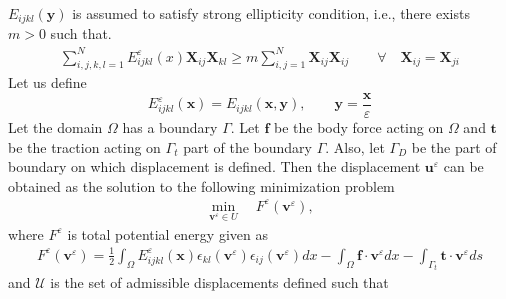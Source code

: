 \documentclass[openright,twoside]{iitkthesis}
\newcommand{\e}[1]{\textbf{#1}}
\newcommand{\fj}[2]{\frac{\partial #1}{\partial #2}}
\begin{document}
$E_{ijkl}(\e y)$ is assumed to satisfy strong ellipticity condition, i.e., there exists $m>0$ such that.
\begin{gather}
\sum_{i,j,k,l=1}^N E_{ijkl}^\varepsilon(x)\textbf{X}_{ij}\textbf{X}_{kl}\geq m\sum_{i,j=1}^N\textbf{X}_{ij}\textbf{X}_{ij} \qquad \forall \quad \textbf{X}_{ij}=\textbf{X}_{ji}
\end{gather}
Let us define
\begin{equation}
E_{ijkl}^\varepsilon (\textbf{x}) = E_{ijkl}(\textbf{x},\textbf{y}), \qquad \textbf{y} = \frac{\textbf{x}}{\varepsilon}
\end{equation}
Let the domain $\Omega$ has a boundary $\Gamma$. Let $\textbf{f}$ be the body force acting on $\Omega$ and $\textbf{t}$ be the traction acting on $\Gamma_t$ part of the boundary $\Gamma$. Also, let $\Gamma_D$ be the part of boundary on which displacement is defined. Then the displacement $\textbf{u}^\varepsilon$ can be obtained as the solution to the following minimization problem
\begin{align}
\label{fem}
\min_{\textbf{v}^\varepsilon\in U} \quad F^\varepsilon(\textbf{v}^\varepsilon),
\end{align} 
where $F^\varepsilon$ is total potential energy given as	
\begin{eqnarray} \label{tpe}
F^\varepsilon(\textbf{v}^\varepsilon) = \frac{1}{2}\int_\Omega E^\varepsilon_{ijkl}(\e x)\epsilon_{kl}(\textbf{v}^\varepsilon)\epsilon_{ij}(\textbf{v}^\varepsilon)dx-\int_\Omega\textbf{f}\cdot\textbf{v}^\varepsilon dx - \int_{\Gamma_t}\textbf{t}\cdot\textbf{v}^\varepsilon ds
\end{eqnarray}
and $\mathcal{U}$ is the set of admissible displacements defined such that
\end{document}
